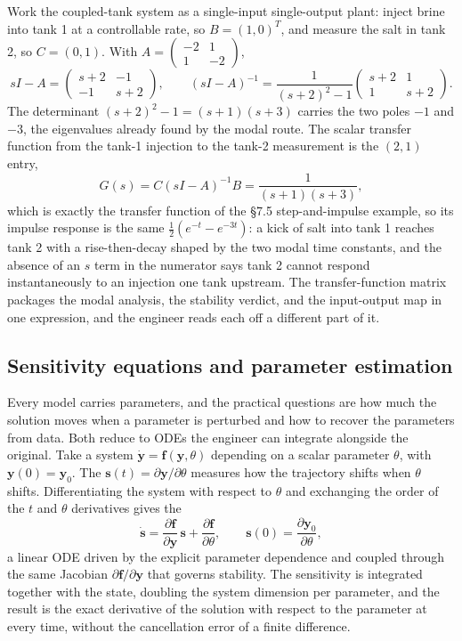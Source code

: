 Work the coupled-tank system as a single-input single-output plant:
inject brine into tank 1 at a controllable rate, so $B = (1, 0)^{T}$,
and measure the salt in tank 2, so $C = (0, 1)$. With $A =
\begin{pmatrix} -2 & 1 \\ 1 & -2 \end{pmatrix}$,
\[
sI - A = \begin{pmatrix} s + 2 & -1 \\ -1 & s + 2 \end{pmatrix},
\qquad
(sI - A)^{-1} = \frac{1}{(s+2)^{2} - 1}
\begin{pmatrix} s + 2 & 1 \\ 1 & s + 2 \end{pmatrix}.
\]
The determinant $(s+2)^{2} - 1 = (s + 1)(s + 3)$ carries the two poles
$-1$ and $-3$, the eigenvalues already found by the modal route. The
scalar transfer function from the tank-1 injection to the tank-2
measurement is the $(2,1)$ entry,
\[
G(s) = C(sI - A)^{-1}B = \frac{1}{(s + 1)(s + 3)},
\]
which is exactly the transfer function of the \S7.5 step-and-impulse
example, so its impulse response is the same
$\tfrac{1}{2}(e^{-t} - e^{-3t})$: a kick of salt into tank 1 reaches
tank 2 with a rise-then-decay shaped by the two modal time constants,
and the absence of an $s$ term in the numerator says tank 2 cannot
respond instantaneously to an injection one tank upstream. The
transfer-function matrix packages the modal analysis, the stability
verdict, and the input-output map in one expression, and the engineer
reads each off a different part of it.

\subsection{Sensitivity equations and parameter estimation}

Every model carries parameters, and the practical questions are how
much the solution moves when a parameter is perturbed and how to
recover the parameters from data. Both reduce to ODEs the engineer can
integrate alongside the original. Take a system $\dot{\mathbf{y}} =
\mathbf{f}(\mathbf{y}, \theta)$ depending on a scalar parameter
$\theta$, with $\mathbf{y}(0) = \mathbf{y}_{0}$. The
 $\mathbf{s}(t) = \partial \mathbf{y}/\partial
\theta$ measures how the trajectory shifts when $\theta$ shifts.
Differentiating the system with respect to $\theta$ and exchanging the
order of the $t$ and $\theta$ derivatives gives the
\[
\dot{\mathbf{s}} = \frac{\partial \mathbf{f}}{\partial \mathbf{y}}\,
\mathbf{s} + \frac{\partial \mathbf{f}}{\partial \theta},
\qquad
\mathbf{s}(0) = \frac{\partial \mathbf{y}_{0}}{\partial \theta},
\]
a linear ODE driven by the explicit parameter dependence and coupled
through the same Jacobian $\partial \mathbf{f}/\partial \mathbf{y}$ that
governs stability. The sensitivity is integrated together with the
state, doubling the system dimension per parameter, and the result is
the exact derivative of the solution with respect to the parameter at
every time, without the cancellation error of a finite difference.

